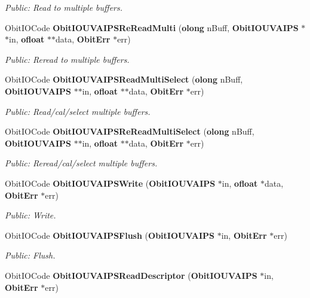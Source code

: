 \begin{CompactItemize}
\begin{CompactList}\small\item\em Public: Read to multiple buffers. \item\end{CompactList}\item 
Obit\-IOCode {\bf Obit\-IOUVAIPSRe\-Read\-Multi} ({\bf olong} n\-Buff, {\bf Obit\-IOUVAIPS} $\ast$$\ast$in, {\bf ofloat} $\ast$$\ast$data, {\bf Obit\-Err} $\ast$err)
\begin{CompactList}\small\item\em Public: Reread to multiple buffers. \item\end{CompactList}\item 
Obit\-IOCode {\bf Obit\-IOUVAIPSRead\-Multi\-Select} ({\bf olong} n\-Buff, {\bf Obit\-IOUVAIPS} $\ast$$\ast$in, {\bf ofloat} $\ast$$\ast$data, {\bf Obit\-Err} $\ast$err)
\begin{CompactList}\small\item\em Public: Read/cal/select multiple buffers. \item\end{CompactList}\item 
Obit\-IOCode {\bf Obit\-IOUVAIPSRe\-Read\-Multi\-Select} ({\bf olong} n\-Buff, {\bf Obit\-IOUVAIPS} $\ast$$\ast$in, {\bf ofloat} $\ast$$\ast$data, {\bf Obit\-Err} $\ast$err)
\begin{CompactList}\small\item\em Public: Reread/cal/select multiple buffers. \item\end{CompactList}\item 
Obit\-IOCode {\bf Obit\-IOUVAIPSWrite} ({\bf Obit\-IOUVAIPS} $\ast$in, {\bf ofloat} $\ast$data, {\bf Obit\-Err} $\ast$err)
\begin{CompactList}\small\item\em Public: Write. \item\end{CompactList}\item 
Obit\-IOCode {\bf Obit\-IOUVAIPSFlush} ({\bf Obit\-IOUVAIPS} $\ast$in, {\bf Obit\-Err} $\ast$err)
\begin{CompactList}\small\item\em Public: Flush. \item\end{CompactList}\item 
Obit\-IOCode {\bf Obit\-IOUVAIPSRead\-Descriptor} ({\bf Obit\-IOUVAIPS} $\ast$in, {\bf Obit\-Err} $\ast$err)

\end{CompactItemize}
